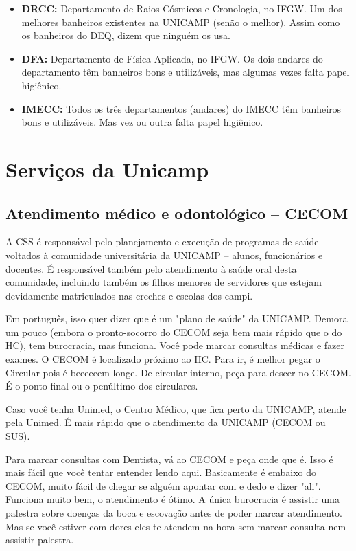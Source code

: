 \documentclass[a4paper,10pt]{article}
\begin{document}
\begin{itemize}
\item  \textbf{DRCC:} Departamento de Raios Cósmicos e Cronologia, no IFGW. Um dos melhores banheiros existentes na UNICAMP (senão o melhor). Assim como os banheiros do DEQ, dizem que ninguém os usa.
\end{itemize}

\begin{itemize}
\item  \textbf{DFA:} Departamento de Física Aplicada, no IFGW. Os dois andares do departamento têm banheiros bons e utilizáveis, mas algumas vezes falta papel higiênico.
\end{itemize}

\begin{itemize}
\item  \textbf{IMECC:} Todos os três departamentos (andares) do IMECC têm banheiros bons e utilizáveis. Mas vez ou outra falta papel higiênico.
\end{itemize}

\section{Serviços da Unicamp}
\subsection{Atendimento médico e odontológico -- CECOM}
A CSS é responsável pelo planejamento e execução de programas de saúde voltados
à comunidade universitária da UNICAMP -- alunos, funcionários e docentes.
É responsável também pelo atendimento à saúde oral desta comunidade, incluindo
também os filhos menores de servidores que estejam devidamente matriculados nas
creches e escolas dos campi.

Em português, isso quer dizer que é um "plano de saúde" da UNICAMP. Demora um
pouco (embora o pronto-socorro do CECOM seja bem mais rápido que o do HC), tem
burocracia, mas funciona. Você pode marcar consultas médicas e fazer exames.
O CECOM é localizado próximo ao HC. Para ir, é melhor pegar o Circular pois
é beeeeeem longe. De circular interno, peça para descer no CECOM. É o ponto
final ou o penúltimo dos circulares.

Caso você tenha Unimed, o Centro Médico, que fica perto da UNICAMP, atende pela
Unimed. É mais rápido que o atendimento da UNICAMP (CECOM ou SUS).

Para marcar consultas com Dentista, vá ao CECOM e peça onde que é. Isso é mais
fácil que você tentar entender lendo aqui. Basicamente é embaixo do CECOM, muito
fácil de chegar se alguém apontar com e dedo e dizer "ali". Funciona muito bem,
o atendimento é ótimo. A única burocracia é assistir uma palestra sobre doenças
da boca e escovação antes de poder marcar atendimento. Mas se você estiver com
dores eles te atendem na hora sem marcar consulta nem assistir palestra.
\end{document}
